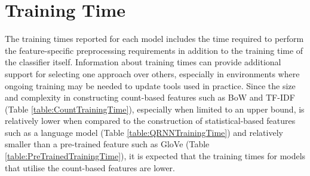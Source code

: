 \documentclass[a4paper,twoside,phd]{BYUPhys}
\begin{document}
\section{Training Time}
\label{sec:TrainingTime}

The training times reported for each model includes the time required to perform the feature-specific preprocessing requirements in addition to the training time of the classifier itself. Information about training times can provide additional support for selecting one approach over others, especially in environments where ongoing training may be needed to update tools used in practice. Since the size and complexity in constructing count-based features such as BoW and TF-IDF (Table \ref{table:CountTrainingTime}), especially when limited to an upper bound, is relatively lower when compared to the construction of statistical-based features such as a language model (Table \ref{table:QRNNTrainingTime}) and relatively smaller than a pre-trained feature such as GloVe (Table \ref{table:PreTrainedTrainingTime}), it is expected that the training times for models that utilise the count-based features are lower.
\end{document}
